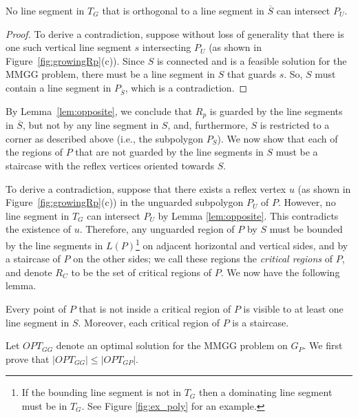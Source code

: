 \documentclass{llncs}
\begin{document}
\begin{lemma}
\label{lem:opposite}
No line segment in $T_G$ that is orthogonal to a line segment in $\overline{S}$ can intersect $P_U$.
\end{lemma}
\begin{proof}
To derive a contradiction, suppose without loss of generality that there is one such vertical line segment $s$ intersecting $P_U$ 
(as shown in Figure~\ref{fig:growingRp}(c)).
Since $S$ is connected and is a feasible solution for the MMGG problem, there must be a line segment in $S$ that
guards $s$. So, $S$ must contain a line segment in $P_{\overline{S}}$, which is a contradiction.
\end{proof}

By Lemma~\ref{lem:opposite}, we conclude that $R_p$ is guarded by the line
segments in $\overline{S}$,
but not by any line segment in $S$, and, furthermore, $S$ is restricted to a corner as described above (i.e., the subpolygon $P_S$). We now show that each of the regions of $P$ that are not guarded by
the line segments in $S$ must be a staircase with the reflex vertices oriented towards $S$.

To derive a contradiction, suppose that there exists a reflex vertex $u$ (as shown in Figure~\ref{fig:growingRp}(c)) in the unguarded subpolygon $P_U$ of $P$. However, no 
line segment in $T_G$ can intersect $P_U$ by Lemma \ref{lem:opposite}. This
contradicts the existence of $u$. Therefore, any unguarded region of $P$ by $S$ must be bounded by the line segments 
in $L(P)$\footnote{If the bounding line segment is not in $T_G$ then a dominating line segment must be in $T_G$. 
See Figure \ref{fig:ex_poly} for an example.} on adjacent horizontal and
vertical sides, and by a staircase of $P$ on the other sides; we call these regions the \emph{critical regions} of $P$, and denote $R_C$ to be the set of critical regions
of $P$. We now have the following lemma.



\begin{lemma}
\label{lem:contradiction}
Every point of $P$ that is not inside a critical region of $P$ is visible to at least one
line segment in $S$. Moreover, each critical region of $P$ is a staircase.
\end{lemma}

Let $OPT_{GG}$ denote an optimal solution for the MMGG problem on $G_P$. We first prove
that $\lvert OPT_{GG}\rvert\leq \lvert OPT_{GP}\rvert$.
\end{document}
